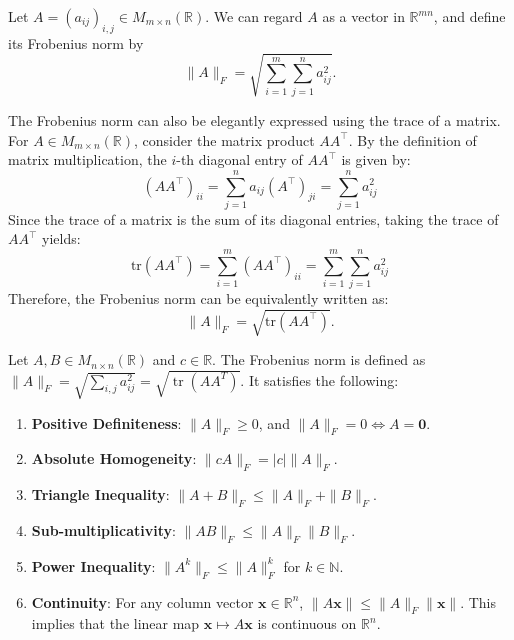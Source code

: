 \begin{definition}
Let $A=(a_{ij})_{i,j}\in M_{m\times n}(\mathbb{R})$. We can regard $A$ as a vector in $\mathbb{R}^{mn}$, and define its
Frobenius norm by
$$\|A\|_F = \sqrt{\sum_{i=1}^m \sum_{j=1}^n a_{ij}^2}.$$
\end{definition}

\begin{remark}
The Frobenius norm can also be elegantly expressed using the trace of a matrix. 
For $A \in M_{m \times n}(\mathbb{R})$, consider the matrix product $A A^\top$. By the definition of matrix multiplication, the $i$-th diagonal entry of $A A^\top$ is given by:
$$(A A^\top)_{ii} = \sum_{j=1}^n a_{ij} (A^\top)_{ji} = \sum_{j=1}^n a_{ij}^2$$
Since the trace of a matrix is the sum of its diagonal entries, taking the trace of $A A^\top$ yields:
$$\text{tr}(A A^\top) = \sum_{i=1}^m (A A^\top)_{ii} = \sum_{i=1}^m \sum_{j=1}^n a_{ij}^2$$
Therefore, the Frobenius norm can be equivalently written as:
$$\|A\|_F = \sqrt{\text{tr}(A A^\top)}.$$
\end{remark}


\begin{property}
Let $A, B \in M_{n \times n}(\mathbb{R})$ and $c \in \mathbb{R}$. The Frobenius norm is defined as $\|A\|_F = \sqrt{\sum_{i,j} a_{ij}^2} = \sqrt{\operatorname{tr}(A A^T)}$. It satisfies the following:
\begin{enumerate}
    \item \textbf{Positive Definiteness}: $\|A\|_F \ge 0$, and $\|A\|_F = 0 \iff A = \mathbf{0}$.
    \item \textbf{Absolute Homogeneity}: $\|c A\|_F = |c| \|A\|_F$.
    \item \textbf{Triangle Inequality}: $\|A + B\|_F \le \|A\|_F + \|B\|_F$.
    \item \textbf{Sub-multiplicativity}: $\|AB\|_F \le \|A\|_F \|B\|_F$. 
    \item \textbf{Power Inequality}: $\|A^k\|_F \le \|A\|_F^k$ for $k \in \mathbb{N}$.
    \item \textbf{Continuity}: For any column vector $\mathbf{x} \in \mathbb{R}^n$, $\|A\mathbf{x}\| \le \|A\|_F \|\mathbf{x}\|$. This implies that the linear map $\mathbf{x} \mapsto A\mathbf{x}$ is continuous on $\mathbb{R}^n$.
\end{enumerate}
\end{property}

